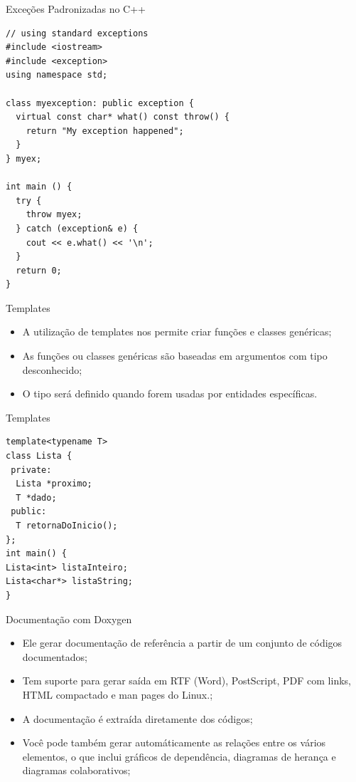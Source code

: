 \documentclass[12pt,table,xcolor={dvipsnames}]{beamer}
\begin{document}
\begin{frame}[fragile]{Exceções Padronizadas no C++}
\begin{lstlisting}
// using standard exceptions
#include <iostream>
#include <exception>
using namespace std;

class myexception: public exception {
  virtual const char* what() const throw() {
    return "My exception happened";
  }
} myex;

int main () {
  try {
    throw myex;
  } catch (exception& e) {
    cout << e.what() << '\n';
  }
  return 0;
}
\end{lstlisting}
\end{frame}

\begin{frame}{Templates}
\begin{itemize}
\item A utilização de templates nos permite criar funções e classes genéricas;
\item As funções ou classes genéricas são baseadas em argumentos com tipo desconhecido;
\item O tipo será definido quando forem usadas por entidades específicas.	
\end{itemize}
\end{frame}

\begin{frame}[fragile]{Templates}
\begin{lstlisting}
template<typename T>
class Lista {
 private: 
  Lista *proximo;
  T *dado;
 public:
  T retornaDoInicio();
};
int main() {
Lista<int> listaInteiro;
Lista<char*> listaString;
}
\end{lstlisting}
\end{frame}

\begin{frame}{Documentação com Doxygen}
\begin{itemize}
\item  Ele gerar  documentação de referência a partir de um conjunto de códigos documentados;
\item  Tem suporte para gerar saída em RTF (Word), PostScript, PDF com links, HTML compactado e man pages do Linux.;
\item A documentação é extraída diretamente dos códigos;
\item Você pode também gerar automáticamente as relações entre os vários elementos, o que inclui gráficos de dependência, diagramas de herança e diagramas colaborativos;
\end{itemize}
\end{frame}
\end{document}
